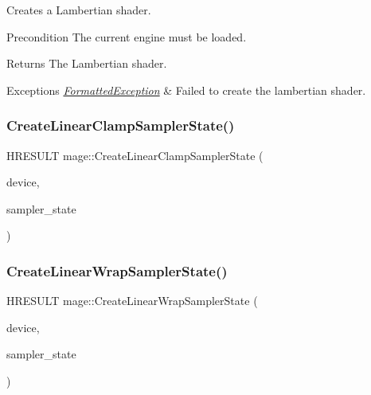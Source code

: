 Creates a Lambertian shader.

\begin{DoxyPrecond}{Precondition}
The current engine must be loaded. 
\end{DoxyPrecond}
\begin{DoxyReturn}{Returns}
The Lambertian shader. 
\end{DoxyReturn}

\begin{DoxyExceptions}{Exceptions}
{\em \hyperlink{structmage_1_1_formatted_exception}{Formatted\+Exception}} & Failed to create the lambertian shader. \\
\hline
\end{DoxyExceptions}
\hypertarget{namespacemage_aa8f37da8dc3c10b5e4e1cd56be94ff95}{}\label{namespacemage_aa8f37da8dc3c10b5e4e1cd56be94ff95} 
\subsubsection{\texorpdfstring{Create\+Linear\+Clamp\+Sampler\+State()}{CreateLinearClampSamplerState()}}
{\footnotesize\ttfamily H\+R\+E\+S\+U\+LT mage\+::\+Create\+Linear\+Clamp\+Sampler\+State (\begin{DoxyParamCaption}\item[{I\+D3\+D11\+Device2 $\ast$}]{device,  }\item[{I\+D3\+D11\+Sampler\+State $\ast$$\ast$}]{sampler\+\_\+state }\end{DoxyParamCaption})}

\hypertarget{namespacemage_a714981745a2e53e5c55b04c4441bd2d0}{}\label{namespacemage_a714981745a2e53e5c55b04c4441bd2d0} 
\subsubsection{\texorpdfstring{Create\+Linear\+Wrap\+Sampler\+State()}{CreateLinearWrapSamplerState()}}
{\footnotesize\ttfamily H\+R\+E\+S\+U\+LT mage\+::\+Create\+Linear\+Wrap\+Sampler\+State (\begin{DoxyParamCaption}\item[{I\+D3\+D11\+Device2 $\ast$}]{device,  }\item[{I\+D3\+D11\+Sampler\+State $\ast$$\ast$}]{sampler\+\_\+state }\end{DoxyParamCaption})}

